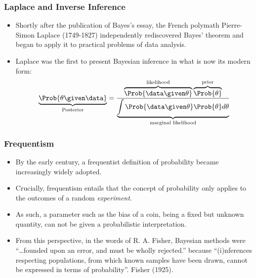 \documentclass{slides}
\begin{document}
\begin{frame}
	\frametitle{Laplace and Inverse Inference}
	\begin{itemize}
		\item Shortly after the publication of Bayes's essay,  the
			French polymath Pierre-Simon Laplace (1749-1827)
			independently rediscovered Bayes' theorem and began to
			apply it to practical problems of data analysis.


	\item Laplace was the first to present Bayesian inference in what is now its modern form:
		\[
			\underbrace{\Prob{\theta \given \data}}_{\text{Posterior}}
			= 
			\frac{\overbrace{\Prob{\data \given \theta}}^{\text{likelihood}}
				\overbrace{\Prob{\theta}}^{\text{prior}}}
				{\underbrace{\int \Prob{\data \given \theta}\Prob{\theta} d\theta}_{\text{marginal likelihood}}}
		\]

\end{itemize}
\end{frame}

\begin{frame}
	\frametitle{Frequentism}
	\begin{itemize}

		\item By the early  century, a frequentist definition
			of probability became increasingly widely adopted.

		\item Crucially, frequentism entails that the concept of
			probability only applies to the outcomes of a random
			\emph{experiment}.

		\item As such, a parameter such as the bias of a coin, being a
			fixed but unknown quantity, can not be given a
			probabilistic interpretation.  

		\item From this perspective, in the words of R. A. Fisher,
			Bayesian methods were ``\ldots founded upon an error,
			and must be wholly rejected.'' because ``(i)nferences
			respecting populations, from which known samples have
			been drawn, cannot be expressed in terms of
			probability''. Fisher (1925).

	\end{itemize}
\end{frame}
\end{document}
